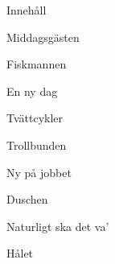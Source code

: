 
\page[right]
\start
\null\blank[3*line]
\centerline{\tfc Innehåll}
\blank[4*line]
\setupwhitespace[line]
\setupnarrower[middle=2cm]
\startnarrower
\tfa
Middagsgästen\hfill\at[middagsgästen]\par

Fiskmannen\hfill\at[fiskmannen]\par

En ny dag\hfill\at[ennydag]\par

Tvättcykler\hfill\at[tvättcykler]\par

Trollbunden\hfill\at[trollbunden]\par

Ny på jobbet\hfill\at[nypåjobbet]\par

Duschen\hfill\at[duschen]\par

Naturligt ska det va’\hfill\at[naturligtskadetva]\par

Hålet\hfill\at[hålet]\par

\stopnarrower
\stop

